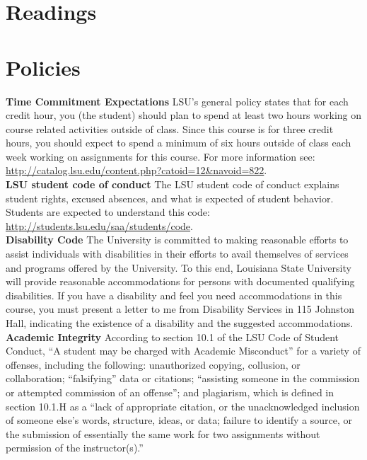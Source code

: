 \documentclass[11pt,article,oneside]{memoir}
\begin{document}
\section{Readings}
\renewcommand*{\bibfont}{\normalsize} %
\vspace*{0.5cm}
\nocite{*}
\setlength{}
\printbibliography[heading=none]

\clearpage

\section{Policies}

\noindent \textbf{Time Commitment Expectations}
LSU's general policy states that for each credit hour, you (the student) should plan to
spend at least two hours working on course related activities outside of class. Since this course is for three credit hours, you should expect to spend a minimum of six hours outside of class each week working on assignments for this course. For more information see: 
\url{http://catalog.lsu.edu/content.php?catoid=12&navoid=822}.\\

\noindent \textbf{LSU student code of conduct}
The LSU student code of conduct explains student rights, excused absences, and what is expected of student behavior. Students are expected to understand this code:  \url{http://students.lsu.edu/saa/students/code}.\\ %

\noindent \textbf{Disability Code}
The University is committed to making reasonable efforts to assist individuals with disabilities in
their efforts to avail themselves of services and programs offered by the University. To this end,
Louisiana State University will provide reasonable accommodations for persons with
documented qualifying disabilities. If you have a disability and feel you need accommodations in
this course, you must present a letter to me from Disability Services in 115 Johnston Hall,
indicating the existence of a disability and the suggested accommodations.\\

\noindent \textbf{Academic Integrity}
According to section 10.1 of the LSU Code of Student Conduct, ``A student may be charged with Academic Misconduct'' for a variety of offenses, including the following: unauthorized copying, collusion, or collaboration; ``falsifying'' data or citations; ``assisting someone in the commission or attempted commission of an offense''; and plagiarism, which is defined in section 10.1.H as a ``lack of appropriate citation, or the unacknowledged inclusion of someone else's words, structure, ideas, or data; failure to identify a source, or the submission of essentially the same work for two assignments without permission of the instructor(s).''\\
\end{document}
